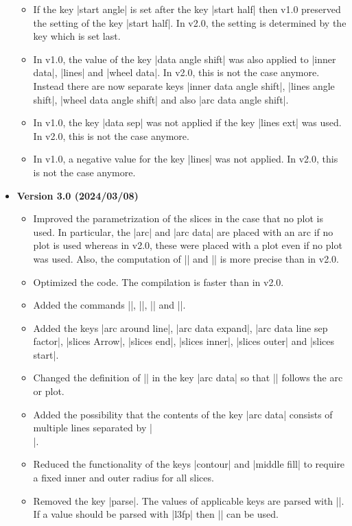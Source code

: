 \documentclass[a4paper,english,dvipsnames]{ltxdoc}
\begin{document}
\begin{itemize}
\begin{itemize}
\item If the key |start angle| is set after the key |start half| then v1.0 preserved the setting of the key |start half|. In v2.0, the setting is determined by the key which is set last.
\item In v1.0, the value of the key |data angle shift| was also applied to |inner data|, |lines| and |wheel data|. In v2.0, this is not the case anymore. Instead there are now separate keys |inner data angle shift|, |lines angle shift|, |wheel data angle shift| and also |arc data angle shift|.
\item In v1.0, the key |data sep| was not applied if the key |lines ext| was used. In v2.0, this is not the case anymore.
\item In v1.0, a negative value for the key |lines| was not applied. In v2.0, this is not the case anymore.
\end{itemize}
\item[] \textbf{Version 3.0 (2024/03/08)}
\begin{itemize}
\item Improved the parametrization of the slices in the case that no plot is used. In particular, the |arc| and |arc data| are placed with an arc if no plot is used whereas in v2.0, these were placed with a plot even if no plot was used. Also, the computation of |\WCdataangle| and |\WCmidangle| is more precise than in v2.0.
\item Optimized the code. The compilation is faster than in v2.0.
\item Added the commands |\WCangle|, |\WCcoordinate|, |\WCpoint| and |\WCradius|.
\item \begin{flushleft}Added the keys |arc around line|, |arc data expand|, |arc data line sep factor|, |slices Arrow|, |slices end|, |slices inner|, |slices outer| and |slices start|.\end{flushleft}
\item Changed the definition of |\WCperc| in the key |arc data| so that |\WCperc| follows the arc or plot.
\item Added the possibility that the contents of the key |arc data| consists of multiple lines separated by |\\|.
\item Reduced the functionality of the keys |contour| and |middle fill| to require a fixed inner and outer radius for all slices.
\item Removed the key |parse|. The values of applicable keys are parsed with |\pgfmathparse|. If a value should be parsed with |l3fp| then |\fpeval| can be used.

\end{itemize}
\end{itemize}
\end{document}
